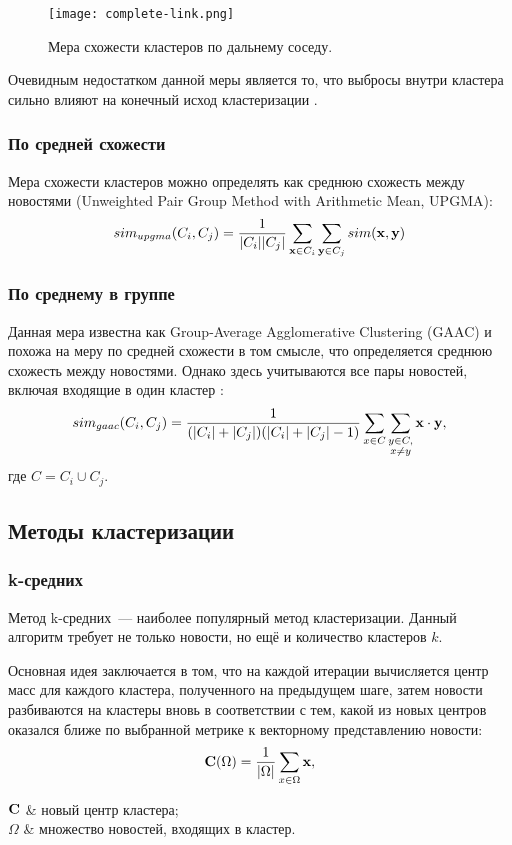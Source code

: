 \begin{figure}[h]
    \centering
    \texttt{[image: complete-link.png]}
    \caption{Мера схожести кластеров по дальнему соседу.}
\end{figure}

Очевидным недостатком данной меры является то, что выбросы внутри кластера сильно влияют на конечный исход кластеризации \cite{zhao05}.

\subsubsection{По средней схожести}
Мера схожести кластеров можно определять как среднюю схожесть между новостями (Unweighted Pair Group Method with Arithmetic Mean, UPGMA):
\begin{equation} \label{eq:upgma}
    sim_{upgma}(C_i,C_j)=\frac{1}{|C_i||C_j|}\sum_{\mathbf{x}\in C_i}\sum_{\mathbf{y}\in C_j}sim(\boldsymbol{\mathbf{x}},\boldsymbol{\mathbf{y}})
\end{equation}

\subsubsection{По среднему в группе}
Данная мера известна как Group-Average Agglomerative Clustering (GAAC) и похожа на меру по средней схожести в том смысле, что определяется среднюю схожесть между новостями. Однако здесь учитываются все пары новостей, включая входящие в один кластер \cite{zhao05}:
\begin{equation}
    sim_{gaac}(C_i,C_j)=\frac{1}{(|C_i|+|C_j|)(|C_i|+|C_j|-1)}\sum_{x\in C}\sum_{\substack{y\in C,\\x\neq y}}\boldsymbol{\mathbf{x}}\cdot\boldsymbol{\mathbf{y}},
\end{equation}
где $C=C_i\cup C_j$.

\subsection{Методы кластеризации}
\subsubsection{k-средних}
Метод k-средних~--- наиболее популярный метод кластеризации. Данный алгоритм требует не только новости, но ещё и количество кластеров $k$.

Основная идея заключается в том, что на каждой итерации вычисляется центр масс для каждого кластера, полученного на предыдущем шаге, затем новости разбиваются на кластеры вновь в соответствии с тем, какой из новых центров оказался ближе по выбранной метрике к векторному представлению новости:
\begin{equation}
    \boldsymbol{\mathbf{C}}(\Omega)=\frac{1}{|\Omega|}\sum_{x\in\Omega}\boldsymbol{\mathbf{x}},
\end{equation}
\begin{conditions}
    $\boldsymbol{\mathbf{C}}$ & новый центр кластера; \\
    $\Omega$ & множество новостей, входящих в кластер. \\
\end{conditions}

